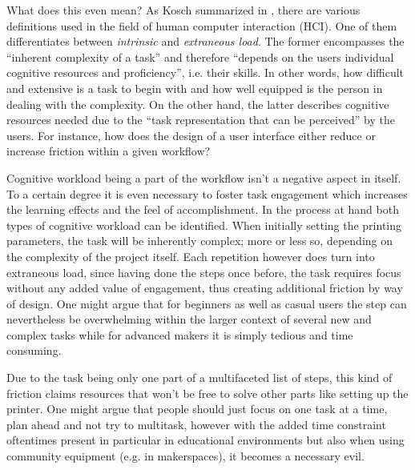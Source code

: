 What does this even mean? 
As Kosch \etal summarized in \cite{kosch_survey_2023}, there are various definitions used in the field of human computer interaction (HCI).
One of them differentiates between \textit{intrinsic} and \textit{extraneous load}.
The former encompasses the ``inherent complexity of a task'' and therefore ``depends on the users individual cognitive resources and proficiency'', i.e. their skills. 
In other words, how difficult and extensive is a task to begin with and how well equipped is the person in dealing with the complexity. 
On the other hand, the latter describes cognitive resources needed due to the ``task representation that can be perceived'' by the users.
For instance, how does the design of a user interface either reduce or increase friction within a given workflow?

Cognitive workload being a part of the workflow isn't a negative aspect in itself. 
To a certain degree it is even necessary to foster task engagement which increases the learning effects and the feel of accomplishment.
In the process at hand both types of cognitive workload can be identified.
When initially setting the printing parameters, the task will be inherently complex; more or less so, depending on the complexity of the project itself. 
Each repetition however does turn into extraneous load, since having done the steps once before, the task requires focus without any added value of engagement, thus creating additional friction by way of design. 
One might argue that for beginners as well as casual users the step can nevertheless be overwhelming within the larger context of several new and complex tasks while for advanced makers it is simply tedious and time consuming. 

Due to the task being only one part of a multifaceted list of steps, this kind of friction claims resources that won't be free to solve other parts like setting up the printer. 
One might argue that people should just focus on one task at a time, plan ahead and not try to multitask, however with the added time constraint oftentimes present in particular in educational environments but also when using community equipment (e.g. in makerspaces), it becomes a necessary evil. %



